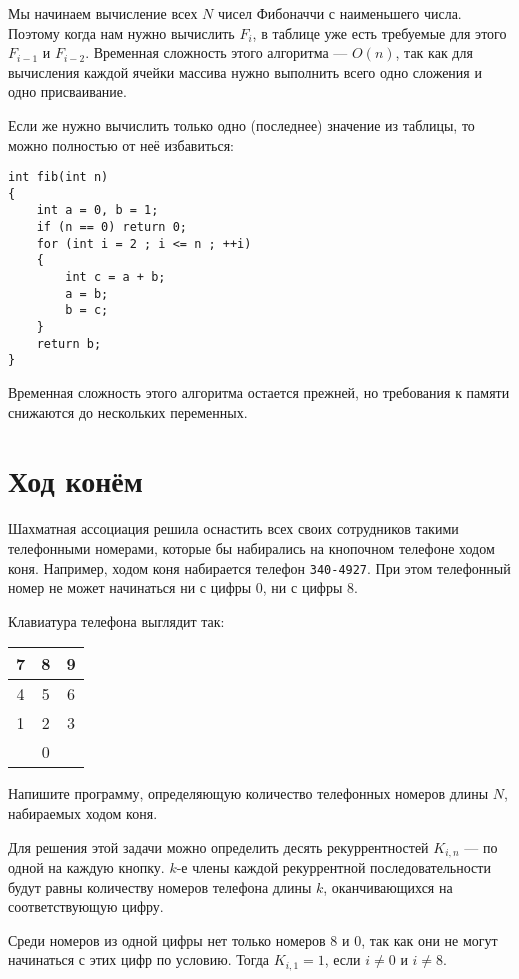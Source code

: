 Мы начинаем вычисление всех $N$ чисел Фибоначчи с наименьшего числа. Поэтому когда нам
нужно вычислить $F_i$, в таблице уже есть требуемые для этого $F_{i-1}$ и $F_{i-2}$.
Временная сложность этого алгоритма --- $O(n)$, так как для вычисления каждой ячейки
массива нужно выполнить всего одно сложения и одно присваивание.

Если же нужно вычислить только одно (последнее) значение из таблицы, то можно полностью
от неё избавиться:

\begin{lstlisting}
int fib(int n)
{
    int a = 0, b = 1;
    if (n == 0) return 0;
    for (int i = 2 ; i <= n ; ++i)
    {
        int c = a + b;
        a = b;
        b = c;
    }
    return b;
}
\end{lstlisting}

Временная сложность этого алгоритма остается прежней, но требования к памяти снижаются
до нескольких переменных.

\section{Ход конём}

Шахматная ассоциация решила оснастить всех своих сотрудников такими
телефонными номерами, которые бы набирались на кнопочном телефоне
ходом коня. Например, ходом коня набирается телефон \texttt{340-4927}. При
этом телефонный номер не может начинаться ни с цифры $0$, ни с цифры $8$.

Клавиатура телефона выглядит так:
{
\LARGE
\begin{tabular}{|c|c|c|}
\hline
7 & 8 & 9 \\
\hline
4 & 5 & 6 \\
\hline
1 & 2 & 3 \\
\hline
  & 0 &   \\
\hline
\end{tabular}
}

Напишите программу, определяющую количество телефонных номеров 
длины $N$, набираемых ходом коня.

Для решения этой задачи можно определить десять рекуррентностей $K_{i,n}$ ---
по одной на каждую кнопку. $k$-е члены каждой рекуррентной последовательности
будут равны количеству номеров телефона длины $k$, оканчивающихся на соответствующую цифру.

Среди номеров из одной цифры нет только номеров $8$ и $0$, так как они не могут
начинаться с этих цифр по условию. Тогда $K_{i,1} = 1$, если $i \neq 0$ и $i \neq 8$.

